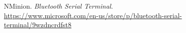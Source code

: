 


\begin{thebibliography}{15}
		NMinion.
		\emph{Bluetooth Serial Terminal}.\\
		\url{https://www.microsoft.com/en-us/store/p/bluetooth-serial-terminal/9wzdncrdfst8}
		


\end{thebibliography}